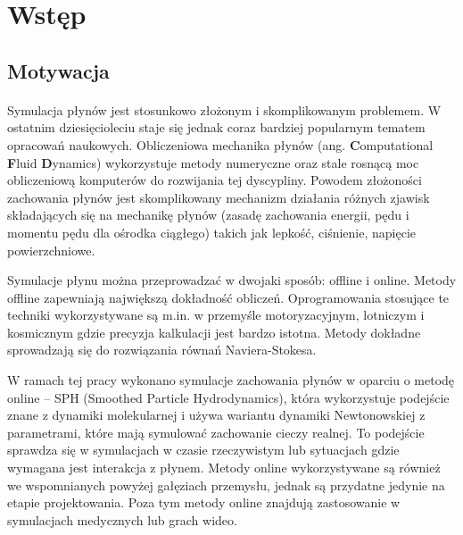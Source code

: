 

%

\section{Wstęp}

\subsection{Motywacja}
\paragraph{}
Symulacja płynów jest stosunkowo złożonym i skomplikowanym problemem. W ostatnim dziesięcioleciu staje się jednak coraz bardziej popularnym tematem opracowań naukowych. Obliczeniowa mechanika płynów (ang. \textbf{C}omputational \textbf{F}luid \textbf{D}ynamics) wykorzystuje metody numeryczne oraz stale rosnącą moc obliczeniową komputerów do rozwijania tej dyscypliny. Powodem złożoności zachowania płynów jest skomplikowany mechanizm działania różnych zjawisk składających się na mechanikę płynów (zasadę zachowania energii, pędu i momentu pędu dla ośrodka ciągłego) takich jak lepkość, ciśnienie, napięcie powierzchniowe.
\par
Symulacje płynu można przeprowadzać w dwojaki sposób: offline i online. Metody offline zapewniają największą dokładność obliczeń. Oprogramowania stosujące te techniki wykorzystywane są m.in. w przemyśle motoryzacyjnym, lotniczym i kosmicznym gdzie precyzja kalkulacji jest bardzo istotna. Metody dokładne sprowadzają się do rozwiązania równań Naviera-Stokesa.
\par
W ramach tej pracy wykonano symulacje zachowania płynów w oparciu o metodę online -- SPH (Smoothed Particle Hydrodynamics), która wykorzystuje podejście znane z dynamiki molekularnej i używa wariantu dynamiki Newtonowskiej z parametrami, które mają symulować zachowanie cieczy realnej. To podejście sprawdza się w symulacjach w czasie rzeczywistym lub sytuacjach gdzie wymagana jest interakcja z płynem. Metody online wykorzystywane są również we wspomnianych powyżej gałęziach przemysłu, jednak są przydatne jedynie na etapie projektowania. Poza tym metody online znajdują zastosowanie w symulacjach medycznych lub grach wideo.
\par

